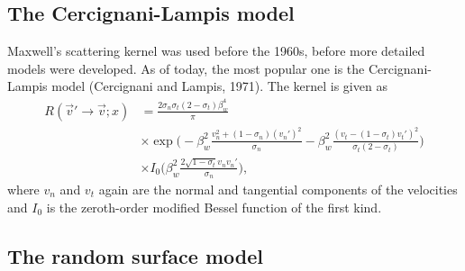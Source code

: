 \subsection{The Cercignani-Lampis model}
Maxwell's scattering kernel was used before the 1960s, before more detailed models were developed. As of today, the most popular one is the Cercignani-Lampis model (Cercignani and Lampis, 1971). The kernel is given as
\begin{align}
	\nonumber
	R(\vec v'\rightarrow \vec v; x) &= \frac{2\sigma_n\sigma_t(2-\sigma_t)\beta_w^4}{\pi}\\
	\nonumber
	&\times\exp\Big(-\beta_w^2\frac{v_n^2 + (1-\sigma_n)(v_n')^2}{\sigma_n} - \beta_w^2\frac{(v_t - (1 - \sigma_t)v_t')^2}{\sigma_t(2 - \sigma_t)}\Big)\\
	&\times I_0\Big(\beta_w^2\frac{2\sqrt{1 - \sigma_t}v_nv_n'}{\sigma_n}\Big),
\end{align}
where $v_n$ and $v_t$ again are the normal and tangential components of the velocities and $I_0$ is the zeroth-order modified Bessel function of the first kind. 

\subsection{The random surface model}
